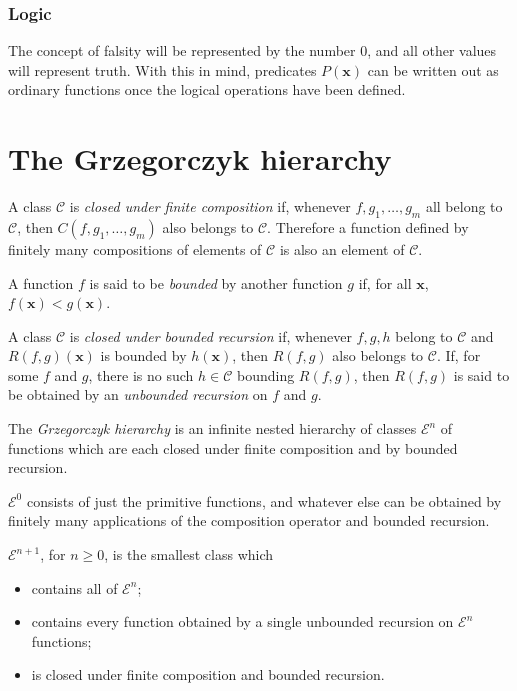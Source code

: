 \documentclass[a4paper]{article}
\newcommand{\grz}[1]{$\mathcal{E}^{#1}$}	%
\newcommand{\xvec}{\mathbf{x}}	%
\newcommand{\classC}{$\mathcal{C}$}
\theoremstyle{plain}
\theoremstyle{definition}
\begin{document}
\subsubsection{Logic}
The concept of falsity will be represented by the number $0$, and all other values will represent truth. With this in mind, predicates $P(\xvec)$ can be written out as ordinary functions once the logical operations have been defined.

\section{The Grzegorczyk hierarchy \label{grzegorczyk}}
A class \classC{}  is {\it closed under finite composition} if, whenever $f, g_1, \dots, g_m$ all belong to \classC{}, then $C(f,g_1, \dots, g_m)$ also belongs to \classC{}. Therefore a function defined by finitely many compositions of elements of \classC{} is also an element of \classC{}.

A function $f$ is said to be {\it bounded} by another function $g$ if, for all $\xvec$, $f(\xvec) < g(\xvec)$.

A class \classC{} is {\it closed under bounded recursion} if, whenever $f,g,h$ belong to \classC{} and $R(f,g)(\xvec)$ is bounded by $h(\xvec)$, then $R(f,g)$ also belongs to \classC{}. If, for some $f$ and $g$, there is no such $h \in \mathcal{C}$ bounding $R(f,g)$, then $R(f,g)$ is said to be obtained by an {\it unbounded recursion} on $f$ and $g$.

The {\it Grzegorczyk hierarchy} is an infinite nested hierarchy of classes \grz{n} of functions which are each closed under finite composition and by bounded recursion. 

\grz{0} consists of just the primitive functions, and whatever else can be obtained by finitely many applications of the composition operator and bounded recursion.

\grz{n+1}, for $n \geq 0$, is the smallest class which

\begin{itemize}
	\item contains all of \grz{n};
	\item contains every function obtained by a single unbounded recursion on \grz{n} functions;
	\item is closed under finite composition and bounded recursion.
\end{itemize}

\end{document}
